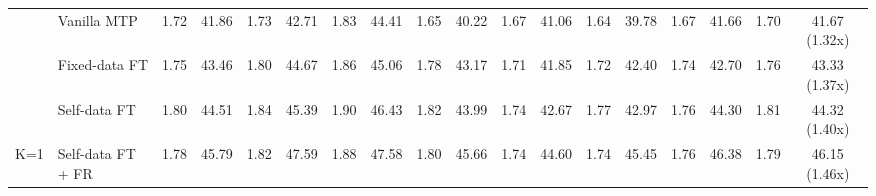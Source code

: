 \documentclass{article} %
\begin{document}
\begin{table}[ht]
\begin{adjustbox}{width=\textwidth}
\begin{tabular}{clcccccccccccccccc}
                                  & Vanilla MTP                                   & 1.72                         & 41.86                                  & 1.73                         & 42.71                                  & 1.83                         & 44.41                                  & 1.65                         & 40.22                                  & 1.67                         & 41.06                                  & 1.64                         & 39.78                                  & 1.67                         & 41.66                                  & 1.70                         & 41.67 (1.32x)                                  \\
                                  & Fixed-data FT                             & 1.75                         & 43.46                                  & 1.80                         & 44.67                                  & 1.86                         & 45.06                                  & 1.78                         & 43.17                                  & 1.71                         & 41.85                                  & 1.72                         & 42.40                                  & 1.74                         & 42.70                                  & 1.76                         & 43.33 (1.37x)                                  \\
                                  & Self-data FT                             & 1.80                         & 44.51                                  & 1.84                         & 45.39                                  & 1.90                         & 46.43                                  & 1.82                         & 43.99                                  & 1.74                         & 42.67                                  & 1.77                         & 42.97                                  & 1.76                         & 44.30                                  & 1.81                         & 44.32 (1.40x)                                  \\
\multirow{-4}{*}{K=1}             & Self-data FT + FR                         & 1.78                         & 45.79                                  & 1.82                         & 47.59                                  & 1.88                         & 47.58                                  & 1.80                         & 45.66                                  & 1.74                         & 44.60                                  & 1.74                         & 45.45                                  & 1.76                         & 46.38                                  & 1.79                         & 46.15 (1.46x)                                  \\ \midrule

\end{tabular}
\end{adjustbox}
\end{table}
\end{document}
